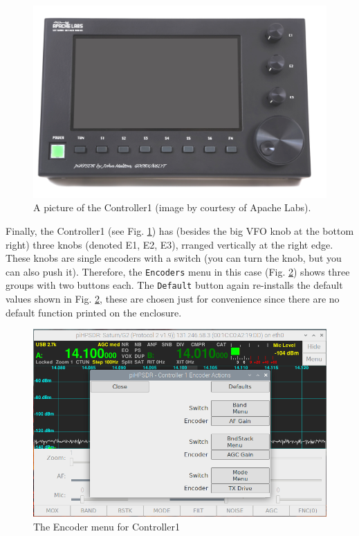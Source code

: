 \documentclass[12pt]{book}
\def\rett#1{\texttt{\color{red}#1}}
\def\bltt#1{\texttt{\color{blue}#1}}
\begin{document}
\begin{figure}[ht!]
\center
\includegraphics[width=12cm]{Apache_Controller1.png}
\caption{A picture of the Controller1 (image by courtesy of Apache Labs).}
\label{fig:Apache_Controller1}
\end{figure}


Finally, the Controller1 (see Fig. \ref{fig:Apache_Controller1})
has (besides the big VFO knob at the bottom right)
three knobs (denoted E1, E2, E3), rranged vertically at the right edge. These knobs
are single encoders with a switch (you can turn the knob, but you can also push it). Therefore,
the \bltt{Encoders} menu in this case (Fig. \ref{fig:EncoderMenuV1}) shows three groups with
two buttons each. The \rett{Default} button again re-installs the default values shown in
Fig. \ref{fig:EncoderMenuV1}, these are chosen just for convenience since there are no default
function printed on the enclosure.

\begin{figure}[ht!]
\center
\includegraphics[width=12cm]{EncoderMenuV1.png}
\caption{The Encoder menu for Controller1}
\label{fig:EncoderMenuV1}
\end{figure}
\end{document}
